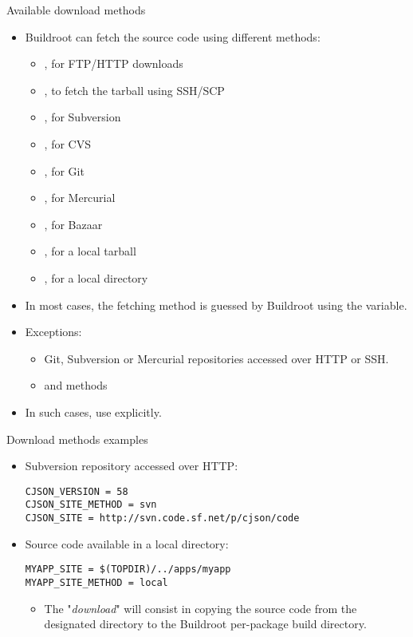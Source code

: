 \begin{frame}{Available download methods}
  \begin{itemize}
  \item Buildroot can fetch the source code using different methods:
    \begin{itemize}
    \item {}, for FTP/HTTP downloads
    \item {}, to fetch the tarball using SSH/SCP
    \item {}, for Subversion
    \item {}, for CVS
    \item {}, for Git
    \item {}, for Mercurial
    \item {}, for Bazaar
    \item {}, for a local tarball
    \item {}, for a local directory
    \end{itemize}
  \item In most cases, the fetching method is guessed by Buildroot
    using the  variable.
  \item Exceptions:
    \begin{itemize}
    \item Git, Subversion or Mercurial repositories accessed over
      HTTP or SSH.
    \item {} and  methods
    \end{itemize}
  \item In such cases, use  explicitly.
  \end{itemize}
\end{frame}

\begin{frame}[fragile]{Download methods examples}

  \begin{itemize}
  \item Subversion repository accessed over HTTP:
    \begin{block}{}
      \begin{verbatim}
CJSON_VERSION = 58
CJSON_SITE_METHOD = svn
CJSON_SITE = http://svn.code.sf.net/p/cjson/code
      \end{verbatim}
    \end{block}
  \item Source code available in a local directory:
    \begin{block}{}
      \begin{verbatim}
MYAPP_SITE = $(TOPDIR)/../apps/myapp
MYAPP_SITE_METHOD = local
      \end{verbatim}
    \end{block}
    \begin{itemize}
    \item The "{\em download}" will consist in copying the source code
      from the designated directory to the Buildroot per-package build
      directory.
    \end{itemize}
  \end{itemize}
\end{frame}

